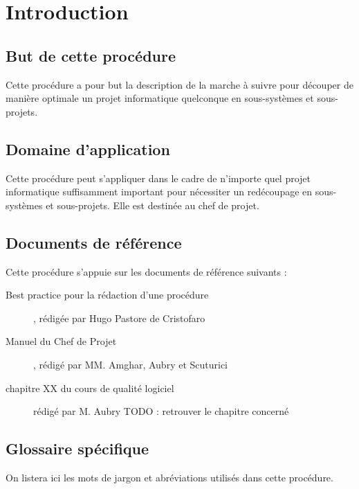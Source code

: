 \section{Introduction}

\subsection{But de cette procédure}

Cette procédure a pour but la description de la marche à suivre pour
découper de manière optimale un projet informatique quelconque en
sous-systèmes et sous-projets.


\subsection{Domaine d'application}

Cette procédure peut s'appliquer dans le cadre de n'importe quel projet
informatique suffisamment important pour nécessiter un redécoupage en
sous-systèmes et sous-projets. Elle est destinée au chef de projet.


\subsection{Documents de référence}

Cette procédure s'appuie sur les documents de référence suivants :

\begin{description}

\item[Best practice pour la rédaction d'une procédure], rédigée par Hugo
Pastore de Cristofaro
\item[Manuel du Chef de Projet], rédigé par MM. Amghar, Aubry et Scuturici 
\item[chapitre XX du cours de qualité logiciel] rédigé par M. Aubry TODO :
retrouver le chapitre concerné

\end{description}


\subsection{Glossaire spécifique}

On listera ici les mots de jargon et abréviations utilisés dans cette
procédure.
